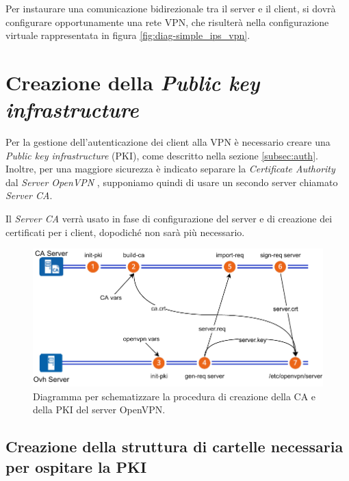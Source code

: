 Per instaurare una comunicazione bidirezionale tra il server e il client, si dovrà configurare opportunamente una rete VPN, che risulterà nella configurazione virtuale rappresentata in figura \ref{fig:diag-simple_ips_vpn}.

\section{Creazione della \textit{Public key infrastructure} \ok}
\label{sec:pki_ca}

Per la gestione dell'autenticazione dei client alla VPN è necessario creare una \textit{Public key infrastructure} (PKI), come descritto nella sezione \ref{subsec:auth}. Inoltre, per una maggiore sicurezza è indicato separare la \textit{Certificate Authority} dal \textit{Server OpenVPN} \cite{openvpn-as-ca}, supponiamo quindi di usare un secondo server chiamato \textit{Server CA}. 

Il \textit{Server CA} verrà usato in fase di configurazione del server e di creazione dei certificati per i client, dopodiché non sarà più necessario.

\begin{figure}[H]
    \centering
    \includegraphics[width=1\linewidth]{immagini/diag-firma_certificato_ca}
    \caption{Diagramma per schematizzare la procedura di creazione della CA e della PKI del server OpenVPN.}
    \label{fig:diag-firma_certificato_ca}
\end{figure}


\subsection{Creazione della struttura di cartelle necessaria per ospitare la PKI \ok}
\label{subsec:pki_structure}

